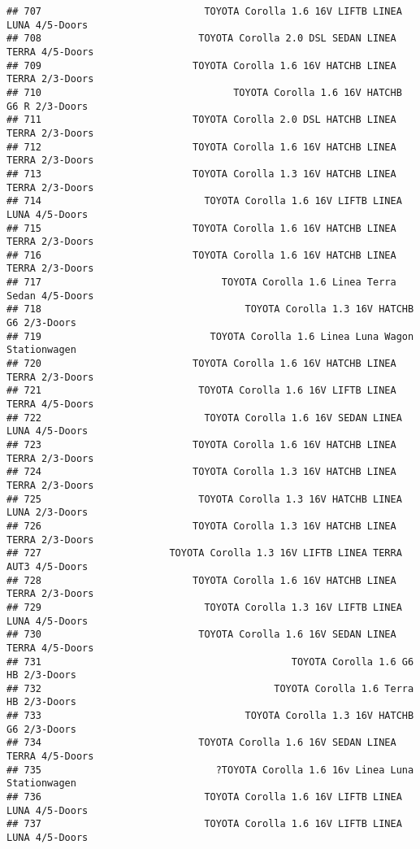 \documentclass[]{article}
\begin{document}
\begin{verbatim}
## 707                            TOYOTA Corolla 1.6 16V LIFTB LINEA LUNA 4/5-Doors
## 708                           TOYOTA Corolla 2.0 DSL SEDAN LINEA TERRA 4/5-Doors
## 709                          TOYOTA Corolla 1.6 16V HATCHB LINEA TERRA 2/3-Doors
## 710                                 TOYOTA Corolla 1.6 16V HATCHB G6 R 2/3-Doors
## 711                          TOYOTA Corolla 2.0 DSL HATCHB LINEA TERRA 2/3-Doors
## 712                          TOYOTA Corolla 1.6 16V HATCHB LINEA TERRA 2/3-Doors
## 713                          TOYOTA Corolla 1.3 16V HATCHB LINEA TERRA 2/3-Doors
## 714                            TOYOTA Corolla 1.6 16V LIFTB LINEA LUNA 4/5-Doors
## 715                          TOYOTA Corolla 1.6 16V HATCHB LINEA TERRA 2/3-Doors
## 716                          TOYOTA Corolla 1.6 16V HATCHB LINEA TERRA 2/3-Doors
## 717                               TOYOTA Corolla 1.6 Linea Terra Sedan 4/5-Doors
## 718                                   TOYOTA Corolla 1.3 16V HATCHB G6 2/3-Doors
## 719                             TOYOTA Corolla 1.6 Linea Luna Wagon Stationwagen
## 720                          TOYOTA Corolla 1.6 16V HATCHB LINEA TERRA 2/3-Doors
## 721                           TOYOTA Corolla 1.6 16V LIFTB LINEA TERRA 4/5-Doors
## 722                            TOYOTA Corolla 1.6 16V SEDAN LINEA LUNA 4/5-Doors
## 723                          TOYOTA Corolla 1.6 16V HATCHB LINEA TERRA 2/3-Doors
## 724                          TOYOTA Corolla 1.3 16V HATCHB LINEA TERRA 2/3-Doors
## 725                           TOYOTA Corolla 1.3 16V HATCHB LINEA LUNA 2/3-Doors
## 726                          TOYOTA Corolla 1.3 16V HATCHB LINEA TERRA 2/3-Doors
## 727                      TOYOTA Corolla 1.3 16V LIFTB LINEA TERRA AUT3 4/5-Doors
## 728                          TOYOTA Corolla 1.6 16V HATCHB LINEA TERRA 2/3-Doors
## 729                            TOYOTA Corolla 1.3 16V LIFTB LINEA LUNA 4/5-Doors
## 730                           TOYOTA Corolla 1.6 16V SEDAN LINEA TERRA 4/5-Doors
## 731                                           TOYOTA Corolla 1.6 G6 HB 2/3-Doors
## 732                                        TOYOTA Corolla 1.6 Terra HB 2/3-Doors
## 733                                   TOYOTA Corolla 1.3 16V HATCHB G6 2/3-Doors
## 734                           TOYOTA Corolla 1.6 16V SEDAN LINEA TERRA 4/5-Doors
## 735                              ?TOYOTA Corolla 1.6 16v Linea Luna Stationwagen
## 736                            TOYOTA Corolla 1.6 16V LIFTB LINEA LUNA 4/5-Doors
## 737                            TOYOTA Corolla 1.6 16V LIFTB LINEA LUNA 4/5-Doors

\end{verbatim}
\end{document}
